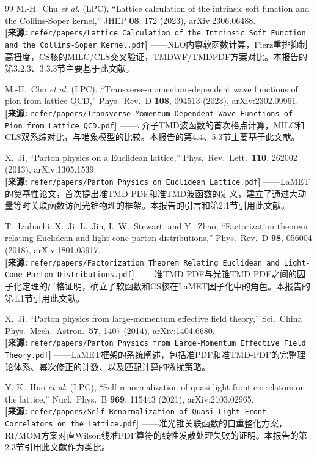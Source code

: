 \documentclass[12pt,a4paper]{ctexart}
\theoremstyle{definition}
\begin{document}
\begin{thebibliography}{99}
M.-H.~Chu \textit{et al.} (LPC),
``Lattice calculation of the intrinsic soft function and the Collins-Soper kernel,''
JHEP \textbf{08}, 172 (2023), arXiv:2306.06488.
\\\textbf{[来源:} \texttt{refer/papers/Lattice Calculation of the Intrinsic Soft Function and the Collins-Soper Kernel.pdf}\textbf{]}
——NLO内禀软函数计算，Fierz重排抑制高扭度，CS核的MILC/CLS交叉验证，TMDWF/TMDPDF方案对比。本报告的第3.2.3、3.3.3节主要基于此文献。

M.-H.~Chu \textit{et al.} (LPC),
``Transverse-momentum-dependent wave functions of pion from lattice QCD,''
Phys.\ Rev.\ D \textbf{108}, 094513 (2023), arXiv:2302.09961.
\\\textbf{[来源:} \texttt{refer/papers/Transverse-Momentum-Dependent Wave Functions of Pion from Lattice QCD.pdf}\textbf{]}
——$\pi$介子TMD波函数的首次格点计算，MILC和CLS双系综对比，与唯象模型的比较。本报告的第4.4、5.3节主要基于此文献。

X.~Ji,
``Parton physics on a Euclidean lattice,''
Phys.\ Rev.\ Lett.\ \textbf{110}, 262002 (2013), arXiv:1305.1539.
\\\textbf{[来源:} \texttt{refer/papers/Parton Physics on Euclidean Lattice.pdf}\textbf{]}
——LaMET的奠基性论文，首次提出准TMD-PDF和准TMD波函数的定义，建立了通过大动量等时关联函数访问光锥物理的框架。本报告的引言和第2.1节引用此文献。

T.~Izubuchi, X.~Ji, L.~Jin, I.~W.~Stewart, and Y.~Zhao,
``Factorization theorem relating Euclidean and light-cone parton distributions,''
Phys.\ Rev.\ D \textbf{98}, 056004 (2018), arXiv:1801.03917.
\\\textbf{[来源:} \texttt{refer/papers/Factorization Theorem Relating Euclidean and Light-Cone Parton Distributions.pdf}\textbf{]}
——准TMD-PDF与光锥TMD-PDF之间的因子化定理的严格证明，确立了软函数和CS核在LaMET因子化中的角色。本报告的第4.1节引用此文献。

X.~Ji,
``Parton physics from large-momentum effective field theory,''
Sci.\ China Phys.\ Mech.\ Astron.\ \textbf{57}, 1407 (2014), arXiv:1404.6680.
\\\textbf{[来源:} \texttt{refer/papers/Parton Physics from Large-Momentum Effective Field Theory.pdf}\textbf{]}
——LaMET框架的系统阐述，包括准PDF和准TMD-PDF的完整理论体系、幂次修正的计数、以及匹配计算的微扰策略。

Y.-K.~Huo \textit{et al.} (LPC),
``Self-renormalization of quasi-light-front correlators on the lattice,''
Nucl.\ Phys.\ B \textbf{969}, 115443 (2021), arXiv:2103.02965.
\\\textbf{[来源:} \texttt{refer/papers/Self-Renormalization of Quasi-Light-Front Correlators on the Lattice.pdf}\textbf{]}
——准光锥关联函数的自重整化方案，RI/MOM方案对直Wilson线准PDF算符的线性发散处理失败的证明。本报告的第2.3节引用此文献作为类比。


\end{thebibliography}
\end{document}
